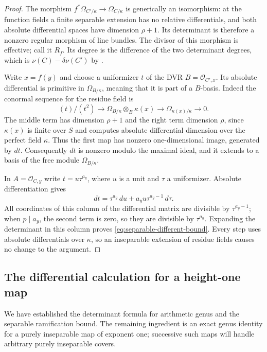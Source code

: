 \begin{proof}
The morphism
$f^*\Omega_{C'/\kappa}\to\Omega_{C/\kappa}$ is generically an isomorphism:
at the function fields a finite separable extension has no relative
differentials, and both absolute differential spaces have dimension
$\rho+1$.  Its determinant is therefore a nonzero regular morphism of
line bundles.  The divisor of this morphism is effective; call it $R_f$.
Its degree is the difference of the two determinant degrees, which is
$\nu(C)-\delta\nu(C')$ by
.

Write $x=f(y)$ and choose a uniformizer $t$ of the DVR
$B=\mathcal O_{C',x}$.  Its absolute differential is primitive in
$\Omega_{B/\kappa}$, meaning that it is part of a $B$-basis.  Indeed the
conormal sequence for the residue field is
\[
 (t)/(t^2)\longrightarrow
 \Omega_{B/\kappa}\otimes_B\kappa(x)
 \longrightarrow\Omega_{\kappa(x)/\kappa}\longrightarrow0.
\]
The middle term has dimension $\rho+1$ and the right term dimension
$\rho$, since $\kappa(x)$ is finite over $S$ and
 computes absolute differential dimension over
the perfect field $\kappa$.  Thus the first map has nonzero
one-dimensional image, generated by $dt$.  Consequently $dt$ is
nonzero modulo the maximal ideal, and it extends to a basis of the
free module $\Omega_{B/\kappa}$.

In $A=\mathcal O_{C,y}$ write $t=u\tau^{a_y}$, where $u$ is a unit and
$\tau$ a uniformizer.  Absolute differentiation gives
\[
 dt=\tau^{a_y}\,du+
       a_yu\tau^{a_y-1}\,d\tau.
\]
All coordinates of this column of the differential matrix are
divisible by $\tau^{a_y-1}$; when $p\mid a_y$, the second term is zero,
so they are divisible by $\tau^{a_y}$.  Expanding the determinant in
this column proves \eqref{eq:separable-different-bound}.  Every step
uses absolute differentials over $\kappa$, so an inseparable extension
of residue fields causes no change to the argument.
\end{proof}

\subsection{The differential calculation for a height-one map}

We have established the determinant formula for arithmetic genus and
the separable ramification bound. The remaining ingredient is an
exact genus identity for a purely inseparable map of exponent one;
successive such maps will handle arbitrary purely inseparable covers.


